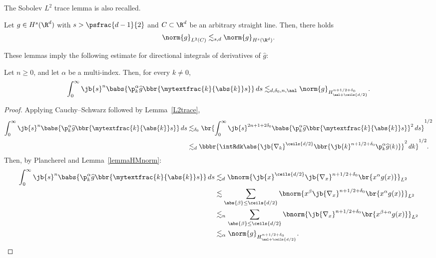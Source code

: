 The Sobolev $L^2$ trace lemma is also recalled.
\begin{lemma} \label{L2trace}
Let $g\in H^s(\R^d)$ with $s>\psfrac{d-1}{2}$ and $C\subset\R^d$ be an arbitrary straight line. Then, there holds
\begin{align*}
\norm{g}_{L^2(C)}\lesssim_{s,d}\norm{g}_{H^s(\R^d)}.
\end{align*}
\end{lemma}
These lemmas imply the following estimate for directional integrals of derivatives of \( \widehat{g} \):
\begin{lemma}\label{gnorm}
Let \( n \geq 0 \), and let \( \alpha \) be a multi-index. Then, for every $k\neq0$,
\begin{align*}
\int_0^\infty\jb{s}^{n}\babs{\p^\alpha_k\widehat g\bbr{\mytextfrac{k}{\abs{k}}s}}\,ds\lesssim_{d,
\delta_0,n,\aal}\norm{g}_{H^{n+{{1/2}}+\delta_0}_{\aal+\ceils{d/2}}}.\end{align*}
\end{lemma}
\begin{proof}
Applying Cauchy--Schwarz followed by Lemma~\ref{L2trace},
\begin{align*}
\int_0^\infty\jb{s}^{n}\babs{\p^\alpha_k\widehat g\bbr{\mytextfrac{k}{\abs{k}}s}}\,ds&\lesssim_{\delta_0}\br{\int_0^\infty\jb{s}^{2n+1+2\delta_0}\babs{\p^\alpha_k\widehat g\bbr{\mytextfrac{k}{\abs{k}}s}}^2\,ds}^{{1/2}}\\
&\lesssim_{d}\bbbr{\intRdk\abs{\jb{\nabla_k}^{\ceils{d/2}}\bbr{\jb{k}^{n+{{1/2}}+\delta_0}\p^\alpha_k\widehat g(k)}}^2\,dk}^{{1/2}}.
\end{align*}
Then, by Plancherel and Lemma~\ref{lemmaHMnorm}:
\begin{align*}
\int_0^\infty\jb{s}^{n}\babs{\p^\alpha_k\widehat g\bbr{\mytextfrac{k}{\abs{k}}s}}\,ds&\lesssim_d\bnorm{\jb{x}^{\ceils{d/2}}\jb{\nabla_x}^{n+{{1/2}}+\delta_0}\br{x^\alpha g(x)}}_{L^2}\\
&\lesssim\sum_{\abs{\beta}\leq\ceils{d/2}}\bnorm{x^\beta\jb{\nabla_x}^{n+{{1/2}}+\delta_0}\br{x^\alpha g(x)}}_{L^2}\\
&\lesssim_n\sum_{\abs{\beta}\leq\ceils{d/2}}\bnorm{\jb{\nabla_x}^{n+{{1/2}}+\delta_0}\br{x^{\beta+\alpha} g(x)}}_{L^2}\\
&\lesssim_\alpha\norm{g}_{H_{\aal+\ceils{d/2}}^{n+{{1/2}}+\delta_0}}.\qedhere
\end{align*}
\end{proof}

